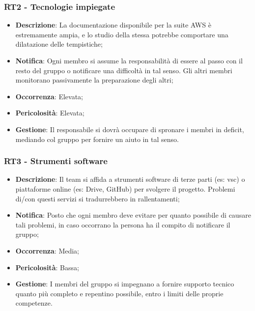 	\subsubsection*{RT2 - Tecnologie impiegate}
	\begin{itemize}
		\item \textbf{Descrizione}: La documentazione disponibile per la suite AWS è estremamente ampia, e lo studio della stessa potrebbe comportare una dilatazione delle tempistiche;
		\item \textbf{Notifica}: Ogni membro si assume la responsabilità di essere al passo con il resto del gruppo o notificare una difficoltà in tal senso. Gli altri membri monitorano passivamente la preparazione degli altri;
		\item \textbf{Occorrenza}: Elevata;
		\item \textbf{Pericolosità}: Elevata;
		\item \textbf{Gestione}: Il responsabile si dovrà occupare di spronare i membri in deficit, mediando col gruppo per fornire un aiuto in tal senso.
	\end{itemize}

   \subsubsection*{RT3 - Strumenti software}
   \begin{itemize}
   	\item \textbf{Descrizione}: Il team si affida a strumenti software di terze parti (es: vsc) o piattaforme online (es: Drive, GitHub) per svolgere il progetto. Problemi di/con questi servizi si tradurrebbero in rallentamenti;
   	\item \textbf{Notifica}: Posto che ogni membro deve evitare per quanto possibile di causare tali problemi, in caso occorrano la persona ha il compito di notificare il gruppo;
   	\item \textbf{Occorrenza}: Media;
   	\item \textbf{Pericolosità}: Bassa;
   	\item \textbf{Gestione}: I membri del gruppo si impegnano a fornire supporto tecnico quanto più completo e repentino possibile, entro i limiti delle proprie competenze.
   \end{itemize}


